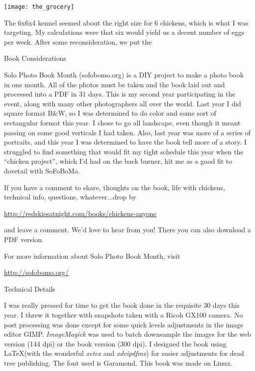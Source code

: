 \vspace*{\fill}
\texttt{[image: the\_grocery]}

The 6x6x4 kennel seemed about the right size for 6 chickens, which is
what I was targeting.  My calculations were that six would yield us a
decent number of eggs per week.  After some reconsideration, we put the
\vspace*{\fill}
\newpage


\vspace*{1in}

{\LARGE Book Considerations}

Solo Photo Book Month (sofobomo.org) is a DIY project to make a photo
book in one month. All of the photos must be taken and the book laid 
out and processed into a PDF in 31 days. This is my second year
participating in the event, along with many other photographers all over
the world. 
Last year I did square format B\&W, so I was determined to do color and
some sort of rectangular format this year. I chose to go all landscape, 
even though it meant passing on some good verticals I had taken. Also,
last year was more of a series of portraits, and this year I was
determined to have the book tell more of a story. I struggled to find
something that would fit my tight schedule this year when the ``chicken
project'', which I'd had on the back burner, hit me as a good fit to
dovetail with SoFoBoMo. 

If you have a comment to share, thoughts on the book, life with
chickens, technical info, questions, whatever...drop by 

\url{http://redskiesatnight.com/books/chickens-anyone}

and leave a comment. We'd love to hear from you! There you can also
download a PDF version. 

For more information about Solo Photo Book Month, visit

\url{http://sofobomo.org/}

\vspace*{0.25in}

{\LARGE Technical Details}

I was really pressed for time to get the book done in the requisite 30
days this year. I threw it together with snapshots taken with a Ricoh
GX100 camera. No post processing was done except for some quick levels
adjustments in the image editor GIMP.
{\em ImageMagick} was used to batch downsample the images for the web version
(144 dpi) or the book version (300 dpi). 
I designed the book using \LaTeX (with the wonderful {\em xetex} and
{\em xdvipdfmx}) for easier adjustments for dead tree publishing. 
The font used is Garamond. This book was made on Linux.

